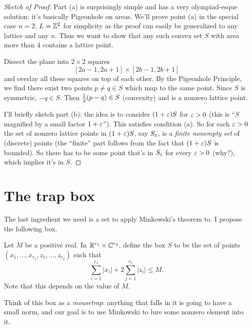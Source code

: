 \begin{proof}[Sketch of Proof]
	Part (a) is surprisingly simple and has a very olympiad-esque solution: it's basically Pigeonhole on areas.
	We'll prove point (a) in the special case $n=2$, $L = \mathbb Z^2$ for simplicity as the proof
	can easily be generalized to any lattice and any $n$.
	Thus we want to show that any such convex set $S$ with area more than $4$ contains a lattice point.

	Dissect the plane into $2 \times 2$ squares 
	\[ [2a-1, 2a+1] \times [2b-1, 2b+1] \]
	and overlay all these squares on top of each other.
	By the Pigeonhole Principle, we find there exist two points $p \neq q \in S$ which map to the same point.
	Since $S$ is symmetric, $-q \in S$. Then $\frac{1}{2} (p-q) \in S$ (convexity) and is a nonzero lattice point.

	I'll briefly sketch part (b): the idea is to consider $(1+\varepsilon) S$ for $\varepsilon > 0$
	(this is ``$S$ magnified by a small factor $1+\varepsilon$'').
	This satisfies condition (a). So for each $\varepsilon > 0$ the set of nonzero lattice points in $(1+\varepsilon) S$,
	say $S_\varepsilon$, is a \emph{finite nonempty set} of (discrete) points
	(the ``finite'' part follows from the fact that $(1+\varepsilon)S$ is bounded).
	So there has to be some point that's in $S_\varepsilon$ for every $\varepsilon > 0$ (why?), which implies it's in $S$.
\end{proof}

\section{The trap box}
The last ingredient we need is a set to apply Minkowski's theorem to.
I propose the following box.
\begin{definition}
	Let $M$ be a positive real.
	In $\mathbb R^{r_1} \times \mathbb C^{r_2}$, define the box $S$ to be the
	set of points $(x_1, \dots, x_{r_1}, z_1, \dots, z_{r_2})$ such that
	\[
		\sum_{i=1}^{r_1} \left\lvert x_i \right\rvert
		+ 2 \sum_{j=1}^{r_2} \left\lvert z_i \right\rvert
		\le M. 
	\]
	Note that this depends on the value of $M$.
\end{definition}

Think of this box as a \emph{mousetrap}: anything that falls in it is going to have a small norm,
and our goal is to use Minkowski to lure some nonzero element into it.

